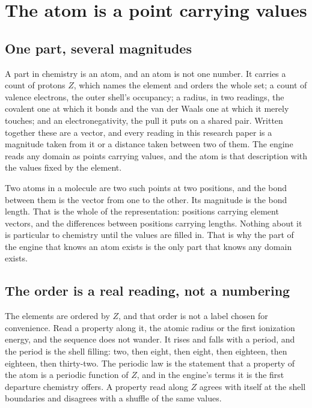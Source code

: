 \chapter{The atom is a point carrying values}

\section{One part, several magnitudes}

A part in chemistry is an atom, and an atom is not one number. It carries a count of protons \(Z\),
which names the element and orders the whole set; a count of valence electrons, the outer
shell's occupancy; a radius, in two readings, the covalent one at which it bonds and the van der
Waals one at which it merely touches; and an electronegativity, the pull it puts on a shared pair.
Written together these are a vector, and every reading in this research paper is a magnitude taken from it or a
distance taken between two of them. The engine reads any domain as points carrying values, and the
atom is that description with the values fixed by the element.

Two atoms in a molecule are two such points at two positions, and the bond between them is the
vector from one to the other. Its magnitude is the bond length. That is the whole of the
representation: positions carrying element vectors, and the differences between positions carrying
lengths. Nothing about it is particular to chemistry until the values are filled in. That is why the
part of the engine that knows an atom exists is the only part that knows any domain exists.

\section{The order is a real reading, not a numbering}

The elements are ordered by \(Z\), and that order is not a label chosen for convenience. Read a
property along it, the atomic radius or the first ionization energy, and the sequence does not
wander. It rises and falls with a period, and the period is the shell filling: two, then eight, then
eight, then eighteen, then eighteen, then thirty-two. The periodic law is the statement that a
property of the atom is a periodic function of \(Z\), and in the engine's terms it is the first
departure chemistry offers. A property read along \(Z\) agrees with itself at the shell boundaries and
disagrees with a shuffle of the same values.

